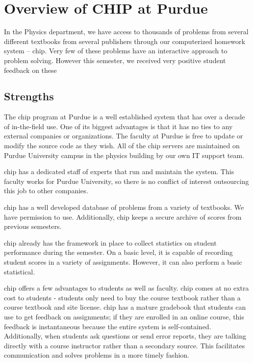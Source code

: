 \section{Overview of CHIP at Purdue}

In the Physics department, we have access to thousands of problems from several different textbooks from several publishers through our computerized homework system – \gls{chip}. Very few of these problems have an interactive approach to problem solving. However this semester, we received very positive student feedback on these

\subsection{Strengths}

The \gls{chip} program at Purdue is a well established system that has over a decade of in-the-field use. One of its biggest advantages is that it has no ties to any external companies or organizations. The faculty at Purdue is free to update or modify the source code as they wish. All of the \gls{chip} servers are maintained on Purdue University campus in the physics building by our own IT support team.

\gls{chip} has a dedicated staff of experts that run and maintain the system. This faculty works for Purdue University, so there is no conflict of interest outsourcing this job to other companies.

\gls{chip} has a well developed database of problems from a variety of textbooks. We have permission to use. Additionally, \gls{chip} keeps a secure archive of scores from previous semesters.

\gls{chip} already has the framework in place to collect statistics on student performance during the semester. On a basic level, it is capable of recording student scores in a variety of assignments. However, it can also perform a basic statistical.

\gls{chip} offers a few advantages to students as well as faculty. \gls{chip} comes at no extra cost to students - students only need to buy the course textbook rather than a course textbook and site license. \gls{chip} has a mature gradebook that students can use to get feedback on assignments; if they are enrolled in an online course, this feedback is instantaneous because the entire system is self-contained. Additionally, when students ask questions or send error reports, they are talking directly with a course instructor rather than a secondary source. This facilitates communication and solves problems in a more timely fashion.

